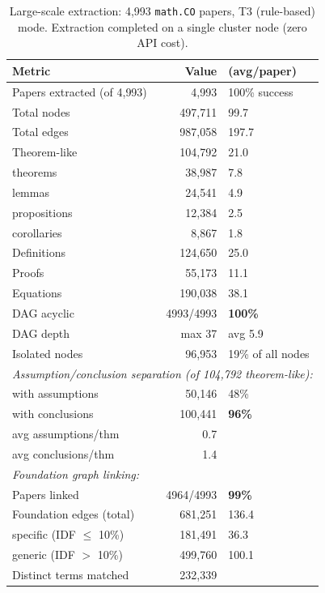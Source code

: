 \begin{table}[h]
\centering
\small
\caption{Large-scale extraction: 4{,}993 \texttt{math.CO} papers, T3 (rule-based) mode. Extraction completed on a single cluster node (zero API cost).}
\label{tab:scale}
\begin{tabular}{lr@{\hspace{1em}}l}
\toprule
\textbf{Metric} & \textbf{Value} & \textbf{(avg/paper)} \\
\midrule
Papers extracted (of 4{,}993) & 4{,}993 & 100\% success \\
Total nodes & 497{,}711 & 99.7 \\
Total edges & 987{,}058 & 197.7 \\
\midrule
Theorem-like & 104{,}792 & 21.0 \\
\quad theorems & 38{,}987 & 7.8 \\
\quad lemmas & 24{,}541 & 4.9 \\
\quad propositions & 12{,}384 & 2.5 \\
\quad corollaries & 8{,}867 & 1.8 \\
Definitions & 124{,}650 & 25.0 \\
Proofs & 55{,}173 & 11.1 \\
Equations & 190{,}038 & 38.1 \\
\midrule
DAG acyclic & 4993/4993 & \textbf{100\%} \\
DAG depth & max 37 & avg 5.9 \\
Isolated nodes & 96{,}953 & 19\% of all nodes \\
\midrule
\multicolumn{3}{l}{\textit{Assumption/conclusion separation (of 104{,}792 theorem-like):}} \\
\quad with assumptions & 50{,}146 & 48\% \\
\quad with conclusions & 100{,}441 & \textbf{96\%} \\
\quad avg assumptions/thm & 0.7 & \\
\quad avg conclusions/thm & 1.4 & \\
\midrule
\multicolumn{3}{l}{\textit{Foundation graph linking:}} \\
\quad Papers linked & 4964/4993 & \textbf{99\%} \\
\quad Foundation edges (total) & 681{,}251 & 136.4 \\
\quad \quad specific (IDF $\leq$ 10\%) & 181{,}491 & 36.3 \\
\quad \quad generic (IDF $>$ 10\%) & 499{,}760 & 100.1 \\
\quad Distinct terms matched & 232{,}339 & \\
\bottomrule
\end{tabular}
\end{table}
